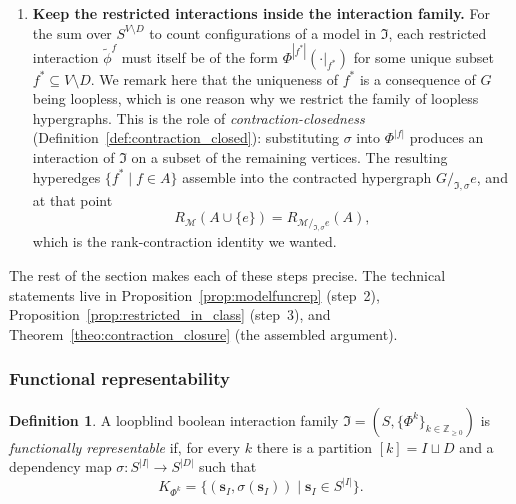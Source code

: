 \documentclass[11pt,reqno]{amsart}
\newcommand{\vecs}{\boldsymbol{s}}
\newcommand{\Mo}{\mathcal{M}}
\newcommand{\IFam}{\mathfrak{I}}
\theoremstyle{plain}
\theoremstyle{definition}
\newtheorem{definition}[theorem]{Definition}
\numberwithin{equation}{section}
\begin{document}
\begin{enumerate}
    \item \textbf{Keep the restricted interactions inside the interaction family.} For the sum over $S^{V \setminus D}$ to count configurations of a model in $\IFam$, each restricted interaction $\widetilde\phi^f$ must itself be of the form $\Phi^{|f^*|}(\cdot|_{f^*})$ for some unique subset $f^* \subseteq V \setminus D$. We remark here that the uniqueness of $f^*$ is a consequence of $G$ being loopless, which is one reason why we restrict the family of loopless hypergraphs. This is the role of \emph{contraction-closedness} (Definition~\ref{def:contraction_closed}): substituting $\sigma$ into $\Phi^{|f|}$ produces an interaction of $\IFam$ on a subset of the remaining vertices. The resulting hyperedges $\{f^* \mid f \in A\}$ assemble into the contracted hypergraph $G /_{\IFam, \sigma} e$, and at that point
    \[
        R_{\Mo}(A \cup \{e\}) = R_{\Mo /_{\IFam, \sigma} e}(A),
    \]
    which is the rank-contraction identity we wanted.
\end{enumerate}

The rest of the section makes each of these steps precise. The technical statements live in Proposition~\ref{prop:modelfuncrep} (step~2), Proposition~\ref{prop:restricted_in_class} (step~3), and Theorem~\ref{theo:contraction_closure} (the assembled argument).


\subsubsection{Functional representability}
\begin{definition}
\label{def:funcrepr}
A loopblind boolean interaction family $\IFam = (S, \{\Phi^k\}_{k \in \mathbb{Z}_{\geq 0}})$ is \emph{functionally representable} if, for every $k$ there is a partition $[k] = I \sqcup D$ and a dependency map $\sigma \colon S^{|I|} \to S^{|D|}$ such that 
\[
K_{\Phi^k} = \{ (\vecs_I, \sigma(\vecs_I)) \mid \vecs_I \in S^{|I|} \}. 
\]
\end{definition}
\end{document}
